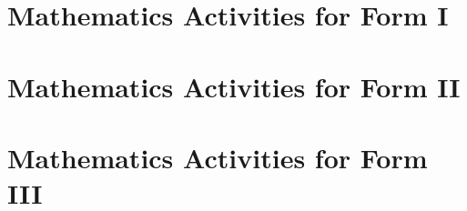 \documentclass[pdftex,10pt,a4paper,twoside]{report}
\begin{document}

\setcounter{page}{2} 



\tableofcontents
\thispagestyle{empty}








\chapter{Mathematics Activities for Form I}
%
%
%
%
%
%
%
%
%
%
%

\chapter{Mathematics Activities for Form II}
%
%
%
%
%
%
%
%
%
%
%

\chapter{Mathematics Activities for Form III}
%
%
%
%
%
%
%
%
\end{document}
